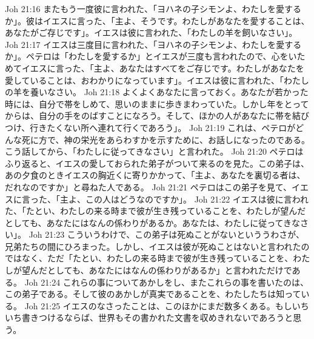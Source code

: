 Joh 21:16  またもう一度彼に言われた、「ヨハネの子シモンよ、わたしを愛するか」。彼はイエスに言った、「主よ、そうです。わたしがあなたを愛することは、あなたがご存じです」。イエスは彼に言われた、「わたしの羊を飼いなさい」。
Joh 21:17  イエスは三度目に言われた、「ヨハネの子シモンよ、わたしを愛するか」。ペテロは「わたしを愛するか」とイエスが三度も言われたので、心をいためてイエスに言った、「主よ、あなたはすべてをご存じです。わたしがあなたを愛していることは、おわかりになっています」。イエスは彼に言われた、「わたしの羊を養いなさい。
Joh 21:18  よくよくあなたに言っておく。あなたが若かった時には、自分で帯をしめて、思いのままに歩きまわっていた。しかし年をとってからは、自分の手をのばすことになろう。そして、ほかの人があなたに帯を結びつけ、行きたくない所へ連れて行くであろう」。
Joh 21:19  これは、ペテロがどんな死に方で、神の栄光をあらわすかを示すために、お話しになったのである。こう話してから、「わたしに従ってきなさい」と言われた。
Joh 21:20  ペテロはふり返ると、イエスの愛しておられた弟子がついて来るのを見た。この弟子は、あの夕食のときイエスの胸近くに寄りかかって、「主よ、あなたを裏切る者は、だれなのですか」と尋ねた人である。
Joh 21:21  ペテロはこの弟子を見て、イエスに言った、「主よ、この人はどうなのですか」。
Joh 21:22  イエスは彼に言われた、「たとい、わたしの来る時まで彼が生き残っていることを、わたしが望んだとしても、あなたにはなんの係わりがあるか。あなたは、わたしに従ってきなさい」。
Joh 21:23  こういうわけで、この弟子は死ぬことがないといううわさが、兄弟たちの間にひろまった。しかし、イエスは彼が死ぬことはないと言われたのではなく、ただ「たとい、わたしの来る時まで彼が生き残っていることを、わたしが望んだとしても、あなたにはなんの係わりがあるか」と言われただけである。
Joh 21:24  これらの事についてあかしをし、またこれらの事を書いたのは、この弟子である。そして彼のあかしが真実であることを、わたしたちは知っている。
Joh 21:25  イエスのなさったことは、このほかにまだ数多くある。もしいちいち書きつけるならば、世界もその書かれた文書を収めきれないであろうと思う。



